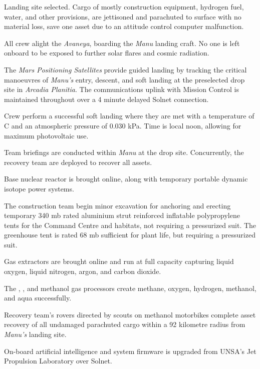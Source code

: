 Landing site selected. Cargo of mostly construction equipment, hydrogen fuel, water, and other provisions, are jettisoned and parachuted to surface with no material loss, save one asset due to an attitude control computer malfunction.
\StopTimelineDate

All crew alight the {\it Avaneya}, boarding the {\it Manu} landing craft. No one is left onboard to be exposed to further solar flares and cosmic radiation.

The {\it Mars Positioning Satellites} provide guided landing by tracking the critical manoeuvres of {\it Manu's} entry, descent, and soft landing at the preselected drop site in {\it Arcadia Planitia}. The communications uplink with Mission Control is maintained throughout over a 4 minute delayed Solnet connection.

Crew perform a successful soft landing where they are met with a temperature of C and an atmospheric pressure of 0.030 kPa. Time is local noon, allowing for maximum photovoltaic use.

Team briefings are conducted within {\it Manu} at the drop site. Concurrently, the recovery team are deployed to recover all assets.

Base nuclear reactor is brought online, along with temporary portable dynamic isotope power systems.

The construction team begin minor excavation for anchoring and erecting temporary 340 mb rated aluminium strut reinforced inflatable polypropylene tents for the Command Centre and habitats, not requiring a pressurized suit. The greenhouse tent is rated 68 mb sufficient for plant life, but requiring a pressurized suit.
\StopTimelineDate

Gas extractors are brought online and run at full capacity capturing liquid oxygen, liquid nitrogen, argon, and carbon dioxide. 

The , , and methanol gas processors create methane, oxygen, hydrogen, methanol, and aqua successfully.
\StopTimelineDate

Recovery team's rovers directed by scouts on methanol motorbikes complete asset recovery of all undamaged parachuted cargo within a 92 kilometre radius from {\it Manu's} landing site.
\StopTimelineDate

On-board artificial intelligence and system firmware is upgraded from UNSA's Jet Propulsion Laboratory over Solnet.

